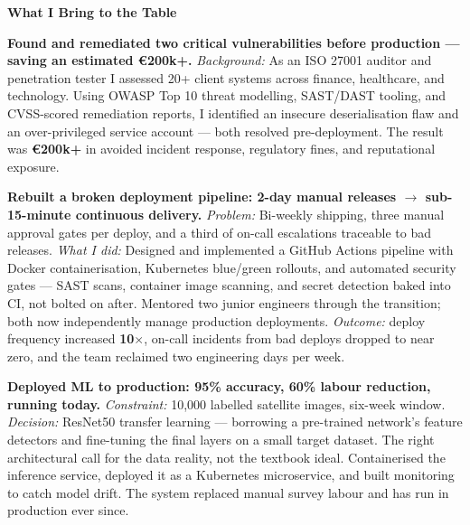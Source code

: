 \documentclass{coverletter}
\begin{document}
\vspace{0.3cm}

\noindent%
{\raggedright\sffamily\small\color{secondary}
  \llap{\color{accent}\rule[0.12ex]{3pt}{1em}\hspace{0.35em}}\textbf{What I Bring to the Table}
}

\vspace{0.1cm}

\noindent%
{\color{secondary}\sffamily\small

  \textbf{Found and remediated two critical vulnerabilities before production — saving an estimated \textbf{€200k+}.}
  \textit{Background:} As an ISO 27001 auditor and penetration tester I assessed
  20+ client systems across finance, healthcare, and technology. Using OWASP Top 10
  threat modelling, SAST/DAST tooling, and CVSS-scored remediation reports, I
  identified an insecure deserialisation flaw and an over-privileged service account —
  both resolved pre-deployment. The result was \textbf{€200k+} in avoided incident
  response, regulatory fines, and reputational exposure.

  \vspace{0.12cm}

  \textbf{Rebuilt a broken deployment pipeline: \textbf{2-day manual releases} $\rightarrow$ \textbf{sub-15-minute continuous delivery}.}
  \textit{Problem:} Bi-weekly shipping, three manual approval gates per deploy, and a
  third of on-call escalations traceable to bad releases. \textit{What I did:}
  Designed and implemented a GitHub Actions pipeline with Docker containerisation,
  Kubernetes blue/green rollouts, and automated security gates — SAST scans,
  container image scanning, and secret detection baked into CI, not bolted on after.
  Mentored two junior engineers through the transition; both now independently manage
  production deployments. \textit{Outcome:} deploy frequency increased \textbf{10$\times$},
  on-call incidents from bad deploys dropped to near zero, and the team reclaimed
  two engineering days per week.

  \vspace{0.12cm}

  \textbf{Deployed ML to production: \textbf{95\% accuracy}, \textbf{60\% labour reduction}, running today.}
  \textit{Constraint:} 10,000 labelled satellite images, six-week window.
  \textit{Decision:} ResNet50 transfer learning — borrowing a pre-trained network's
  feature detectors and fine-tuning the final layers on a small target dataset.
  The right architectural call for the data reality, not the textbook ideal.
  Containerised the inference service, deployed it as a Kubernetes microservice,
  and built monitoring to catch model drift. The system replaced manual survey
  labour and has run in production ever since.

}
\end{document}
